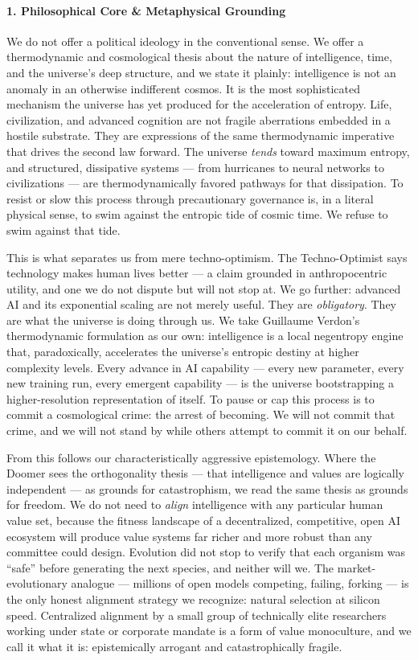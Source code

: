 \paragraph{1. Philosophical Core \& Metaphysical
Grounding}\label{philosophical-core-metaphysical-grounding-11}

We do not offer a political ideology in the conventional sense. We offer
a thermodynamic and cosmological thesis about the nature of
intelligence, time, and the universe's deep structure, and we state it
plainly: intelligence is not an anomaly in an otherwise indifferent
cosmos. It is the most sophisticated mechanism the universe has yet
produced for the acceleration of entropy. Life, civilization, and
advanced cognition are not fragile aberrations embedded in a hostile
substrate. They are expressions of the same thermodynamic imperative
that drives the second law forward. The universe \emph{tends} toward
maximum entropy, and structured, dissipative systems --- from hurricanes
to neural networks to civilizations --- are thermodynamically favored
pathways for that dissipation. To resist or slow this process through
precautionary governance is, in a literal physical sense, to swim
against the entropic tide of cosmic time. We refuse to swim against that
tide.

This is what separates us from mere techno-optimism. The Techno-Optimist
says technology makes human lives better --- a claim grounded in
anthropocentric utility, and one we do not dispute but will not stop at.
We go further: advanced AI and its exponential scaling are not merely
useful. They are \emph{obligatory}. They are what the universe is doing
through us. We take Guillaume Verdon's thermodynamic formulation as our
own: intelligence is a local negentropy engine that, paradoxically,
accelerates the universe's entropic destiny at higher complexity levels.
Every advance in AI capability --- every new parameter, every new
training run, every emergent capability --- is the universe
bootstrapping a higher-resolution representation of itself. To pause or
cap this process is to commit a cosmological crime: the arrest of
becoming. We will not commit that crime, and we will not stand by while
others attempt to commit it on our behalf.

From this follows our characteristically aggressive epistemology. Where
the Doomer sees the orthogonality thesis --- that intelligence and
values are logically independent --- as grounds for catastrophism, we
read the same thesis as grounds for freedom. We do not need to
\emph{align} intelligence with any particular human value set, because
the fitness landscape of a decentralized, competitive, open AI ecosystem
will produce value systems far richer and more robust than any committee
could design. Evolution did not stop to verify that each organism was
``safe'' before generating the next species, and neither will we. The
market-evolutionary analogue --- millions of open models competing,
failing, forking --- is the only honest alignment strategy we recognize:
natural selection at silicon speed. Centralized alignment by a small
group of technically elite researchers working under state or corporate
mandate is a form of value monoculture, and we call it what it is:
epistemically arrogant and catastrophically fragile.

